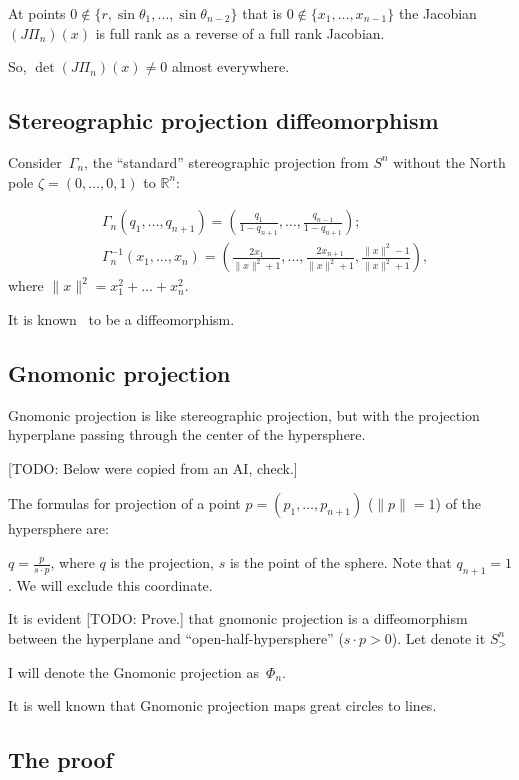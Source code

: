 \documentclass{amsart}
\begin{document}
At points $0\notin\{r,\sin\theta_1,\dots,\sin\theta_{n-2}\}$ that is $0\notin\{x_1,\dots,x_{n-1}\}$ the Jacobian $(J\Pi_n)(x)$
is full rank as a reverse of a full rank Jacobian.

So, $\det (J\Pi_n)(x)\ne 0$ almost everywhere.

\subsection{Stereographic projection diffeomorphism}

Consider~$\Gamma_n$, the ``standard'' stereographic projection from $S^n$ without the North pole $\zeta=(0,\dots,0,1)$ to $\mathbb{R}^n$:

\begin{align*}
&\Gamma_n(q_1,\dots,q_{n+1}) = \left(\frac{q_1}{1-q_{n+1}},\dots,\frac{q_{n-1}}{1-q_{n+1}}\right);\\
&\Gamma_n^{-1}(x_1,\dots,x_n) = \left(\frac{2x_1}{\lVert x\rVert^2+1},\dots,\frac{2x_{n+1}}{\lVert x\rVert^2+1},\frac{\lVert x\rVert^2-1}{\lVert x\rVert^2+1}\right),
\end{align*}
where $\lVert x\rVert^2 = x_1^2+\dots+x_n^2$.

It is known~\cite{stereo} to be a diffeomorphism.

\subsection{Gnomonic projection}

Gnomonic projection is like stereographic projection, but with the projection hyperplane passing through the center of the hypersphere.

[TODO: Below were copied from an AI, check.]

The formulas for projection of a point $p=(p_1,\dots,p_{n+1})$ ($\lVert p\rVert = 1$) of the hypersphere are:

$q=\frac{p}{s\cdot p}$, where $q$ is the projection, $s$ is the point of the sphere. Note that $q_{n+1}=1$. We will exclude this coordinate.

It is evident [TODO: Prove.] that gnomonic projection is a diffeomorphism between the hyperplane and ``open-half-hy\-per\-sphe\-re'' ($s\cdot p>0$). Let denote it $S^n_{>}$

I will denote the Gnomonic projection as~$\Phi_n$.

It is well known that Gnomonic projection maps great circles to lines.

\subsection{The proof}
\end{document}
